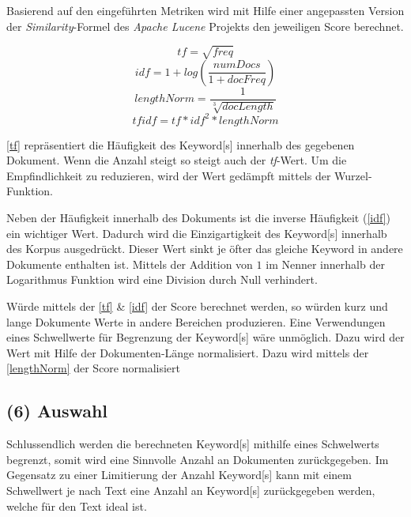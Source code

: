 Basierend auf den eingeführten Metriken wird mit Hilfe einer angepassten Version der \textit{Similarity}-Formel\footnotemark {} des \textit{Apache Lucene} Projekts den jeweiligen Score berechnet.

\begin{equation}\label{tf}
tf = \sqrt{freq} 
\end{equation}
\begin{equation}\label{idf}
idf  =  1 +log( \frac{numDocs}{1 + docFreq})
\end{equation}
\begin{equation}\label{lengthNorm}
lengthNorm =\frac{1}{\sqrt[3]{docLength}} 
\end{equation}
\begin{equation}\label{tfidf}
tfidf = tf * idf^2 * lengthNorm
\end{equation}

\autoref{tf} repräsentiert die Häufigkeit des \gls{Keyword}[s] innerhalb des gegebenen Dokument. Wenn die Anzahl steigt so steigt auch der \textit{tf}-Wert. Um die Empfindlichkeit zu reduzieren, wird der Wert gedämpft mittels der Wurzel-Funktion. 

Neben der Häufigkeit innerhalb des Dokuments ist die inverse Häu\-fig\-keit (\autoref{idf}) ein wichtiger Wert. Dadurch wird die Einzigartigkeit des \gls{Keyword}[s] innerhalb des Korpus ausgedrückt. Dieser Wert sinkt je öfter das gleiche \gls{Keyword} in andere Dokumente enthalten ist. Mittels der Addition von $1$ im Nenner innerhalb der Logarithmus Funktion wird eine Division durch Null verhindert. 

Würde mittels der \autoref{tf} \& \autoref{idf} der Score berechnet werden, so würden kurz und lange Dokumente Werte in andere Bereichen produzieren. Eine Verwendungen eines Schwellwerte für Begrenzung der \gls{Keyword}[s] wäre unmöglich. Dazu wird der Wert mit Hilfe der Dokumenten-Länge normalisiert. Dazu wird mittels der \autoref{lengthNorm} der Score normalisiert

\subsection{(6) Auswahl}
Schlussendlich werden die berechneten \gls{Keyword}[s] mithilfe eines Schw\-el\-werts begrenzt, somit wird eine Sinnvolle Anzahl an Dokumenten zurückgegeben. Im Gegensatz zu einer Limitierung der Anzahl \gls{Keyword}[s] kann mit einem Schwellwert je nach Text eine Anzahl an \gls{Keyword}[s] zurückgegeben werden, welche für den Text ideal ist.

